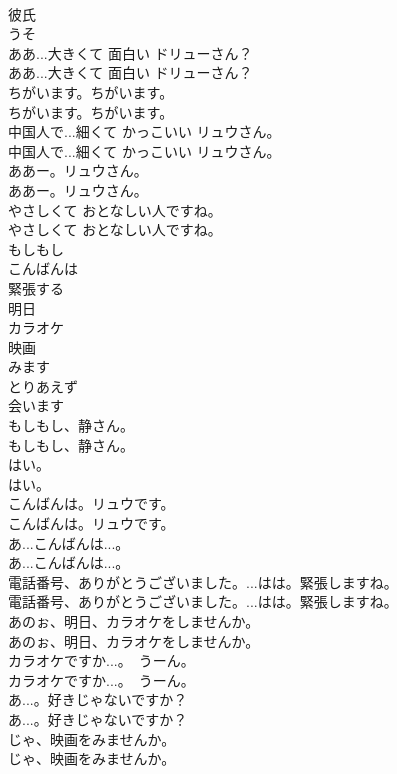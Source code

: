 \documentclass[8pt]{extreport}
\begin{document}
\begin{CJK}{UTF8}{min}
\\	彼氏
\\	うそ
\\	ああ...大きくて 面白い ドリューさん？	
\\	ああ...大きくて 面白い ドリューさん？ 
\\	ちがいます。ちがいます。	
\\	ちがいます。ちがいます。 
\\	中国人で...細くて かっこいい リュウさん。	
\\	中国人で...細くて かっこいい リュウさん。 
\\	ああー。リュウさん。	
\\	ああー。リュウさん。 
\\	やさしくて おとなしい人ですね。	
\\	やさしくて おとなしい人ですね。 
\\	もしもし
\\	こんばんは
\\	緊張する
\\	明日
\\	カラオケ
\\	映画
\\	みます
\\	とりあえず
\\	会います
\\	もしもし、静さん。	
\\	もしもし、静さん。 
\\	はい。	
\\	はい。 
\\	こんばんは。リュウです。	
\\	こんばんは。リュウです。 
\\	あ...こんばんは...。	
\\	あ...こんばんは...。 
\\	電話番号、ありがとうございました。...はは。緊張しますね。	
\\	電話番号、ありがとうございました。...はは。緊張しますね。 
\\	あのぉ、明日、カラオケをしませんか。	
\\	あのぉ、明日、カラオケをしませんか。 
\\	カラオケですか...。　うーん。	
\\	カラオケですか...。　うーん。 
\\	あ...。好きじゃないですか？	
\\	あ...。好きじゃないですか？ 
\\	じゃ、映画をみませんか。	
\\	じゃ、映画をみませんか。 

\end{CJK}
\end{document}
